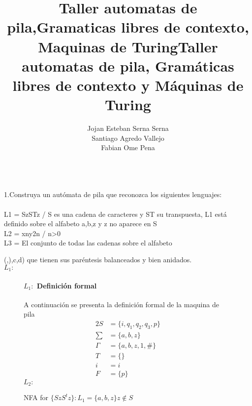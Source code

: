 \documentclass[10pt,a4paper]{book}
\date{}
\title{\Huge Taller automatas de pila,Gramaticas libres de contexto, Maquinas de Turing}
\author{Jojan Esteban Serna Serna\\Santiago Agredo Vallejo\\Fabian Ome Pena}
\begin{document}
	\maketitle
	\title{\huge Taller automatas de pila, Gramáticas libres de contexto y Máquinas de Turing}\\[2cm]
	1.Construya un autómata de pila que reconozca los siguientes lenguajes:\\ \\
	L1 = { SzSTz / S es una cadena de caracteres y ST su transpuesta},  L1 está definido sobre el alfabeto {a,b,z} y z no aparece en S\\
	L2 = { xny2n / n>0}\\
	L3 = El conjunto de todas las cadenas sobre el alfabeto {(,),c,d) que tienen sus paréntesis balanceados y bien anidados.\\
	\textbf{$L_1:$}
		\begin{figure*}[ht]
		\caption{NFA for $\{SzS^tz \} : L_1 = \{a,b,z\} z \notin S$}
\paragraph{$L_1:$ Definición formal}A continuación se presenta la definición formal de la maquina de pila\\[0.2cm]
\begin{alignat*}{2}
	S&= \{i, q_1, q_2, q_3, p\}\\
	\textstyle \sum&= \{a, b, z\}\\
	\Gamma&=\{a, b, z, 1,\#\}\\
	T&=\{\}\\
	i&=i\\
	F&=\{p\}
\end{alignat*}
\newpage
\textbf{$L_2:$}
	\end{figure*}

}
\end{document}
